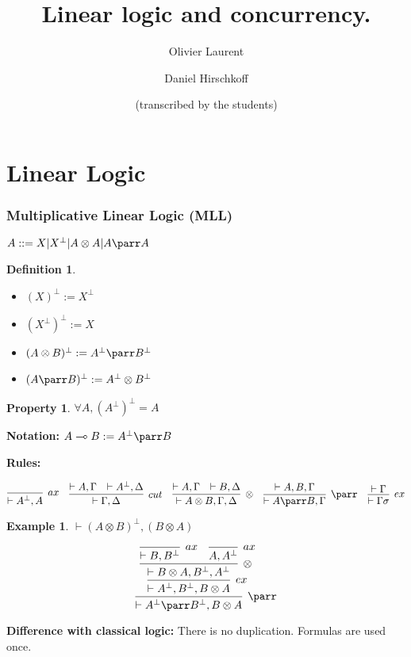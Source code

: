 \documentclass[a4paper,10pt]{article}
\author{Olivier Laurent \and Daniel Hirschkoff \\ \and (transcribed by the students)}
\title{Linear logic and concurrency.}
\newtheorem{definition}{Definition}
\newtheorem{prop}{Property}
\newtheorem{ex}{Example}
\begin{document}
\maketitle
\part{Linear Logic}
\section{Multiplicative Linear Logic (MLL)}

$A ::= X | X ^ \perp | A \otimes A | A \parr A$

\begin{definition}
	\begin{itemize}
		\item $(X)^\perp := X ^\perp$
		\item $(X^\perp)^\perp := X$
		\item $(A \otimes B) ^\perp := A^\perp \parr B^\perp$ 
		\item $(A \parr B)^\perp := A ^\perp \otimes B ^\perp$
	\end{itemize}	
\end{definition}

\begin{prop}
	$\forall A, (A ^\perp)^\perp = A$
\end{prop}

\textbf{Notation:} $A\multimap B :=  A ^\perp \parr B$

\textbf{Rules:}
\begin{center}
$	\infer[ax]{\vdash A^\perp, A}{} \quad
	\infer[cut]{\vdash \Gamma, \Delta}{\vdash A, \Gamma & \vdash A^\perp, \Delta} \quad
	\infer[\otimes]{\vdash A \otimes B, \Gamma, \Delta}{\vdash A, \Gamma & \vdash B, \Delta} \quad
	\infer[\parr]{\vdash A \parr B, \Gamma}{\vdash A, B, \Gamma} \quad
	\infer[ex]{\vdash \Gamma \sigma}{\vdash \Gamma} 
$
\end{center}
	
\begin{ex} \label{ex:comm_par} $\vdash (A\otimes B)^\perp, (B\otimes A)$

$$\infer[\parr]{\vdash A ^\perp \parr B^\perp, B \otimes A}
	{\infer[ex]{\vdash A^\perp,B^\perp,B\otimes A}
		{\infer[\otimes]{\vdash B\otimes A, B^\perp, A^\perp}
			{\infer[ax]{\vdash B, B^\perp}{} & \infer[ax]{A, A^ \perp}{}
			}}}$$
\end{ex}

\textbf{Difference with classical logic:}
There is no duplication. Formulas are used once.
\end{document}
